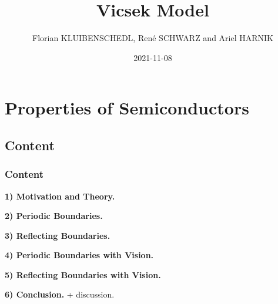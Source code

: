 \documentclass[11pt,t,usepdftitle=false,aspectratio=169]{beamer}
\title[Vicsek Model]{Vicsek Model}
\author[Florian Kluibenschedl, René Schwarz, Ariel Harnik]{Florian KLUIBENSCHEDL, René SCHWARZ and Ariel HARNIK}
\date{2021-11-08}
\begin{document}



	\section{Properties of Semiconductors}

	\subsection{Content}
	\begin{frame}
		\frametitle{Content}
  		\textbf{1) Motivation and Theory.} 
  		
  		\bigskip
  		\textbf{2) Periodic Boundaries.} 
  		
  		\bigskip
  		\textbf{3) Reflecting Boundaries.}
  		
  		\bigskip
  		\textbf{4) Periodic Boundaries with Vision.}
  		
  		\bigskip
  		\textbf{5) Reflecting Boundaries with Vision.}
  		
  		\bigskip
  		\textbf{6) Conclusion.} + discussion.
	\end{frame}
\end{document}
